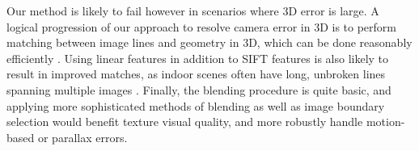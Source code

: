 \documentclass[]{spie}  %
\begin{document}
Our method is likely to fail however in scenarios where 3D error is
large. A logical progression of our approach to resolve camera error
in 3D is to perform matching between image lines and geometry in 3D,
which can be done reasonably efficiently \cite{linebased,
  rectangularstructures}. Using linear features in addition to SIFT
features is also likely to result in improved matches, as indoor
scenes often have long, unbroken lines spanning multiple images
\cite{linearposeestimation}. Finally, the blending procedure is quite
basic, and applying more sophisticated methods of blending as well as
image boundary selection would benefit texture visual quality, and
more robustly handle motion-based or parallax errors.


\end{document}
